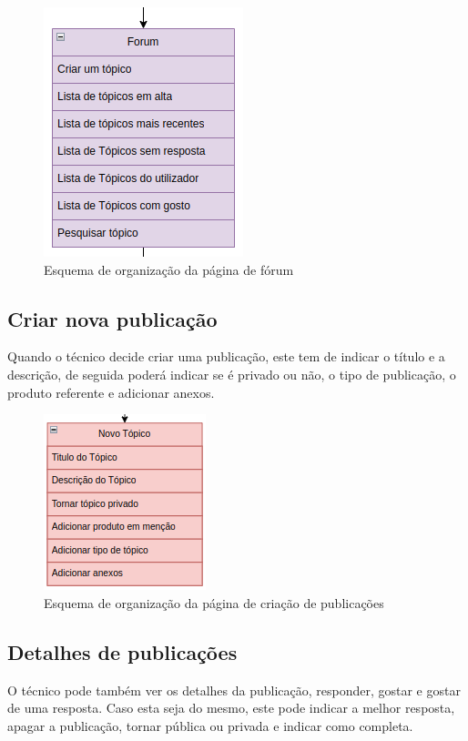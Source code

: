 \begin{figure}[htb]
    \centering
    
    \includegraphics[height=0.4\textwidth]{images/Arquiteturas/superficial_de_app/forum.png}
    \caption{Esquema de organização da página de fórum}
    \label{fig:5}
\end{figure}

\subsection{Criar nova publicação}

Quando o técnico decide criar uma publicação, este tem de indicar o título e a descrição, de seguida poderá indicar se é privado ou não, o tipo de publicação, o produto referente e adicionar anexos.

\begin{figure}[htb]
    \centering
    
    \includegraphics[height=0.3\textwidth]{images/Arquiteturas/superficial_de_app/criar_topico.png}
    \caption{Esquema de organização da página de criação de publicações}
    \label{fig:6}
\end{figure}

\newpage

\subsection{Detalhes de publicações}

O técnico pode também ver os detalhes da publicação, responder, 
gostar e gostar de uma resposta.
Caso esta seja do mesmo, este pode indicar a melhor resposta, apagar a publicação, tornar pública ou privada e indicar como completa.

